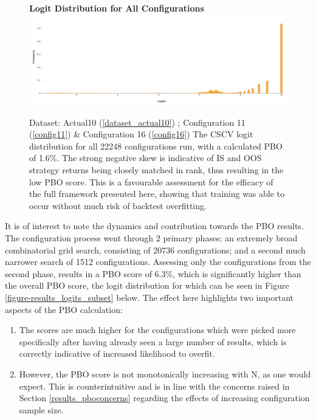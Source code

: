 \documentclass[a4paper,11pt,oneside]{article}
\theoremstyle{plain}
\theoremstyle{definition}
\begin{document}
	\begin{figure}[H]
		\centering 
		\textbf{Logit Distribution for All Configurations}
		\includegraphics[scale=0.25]{images/results/pbo/all_sets_dist.png} 
		\caption[Logit Distribution for All Configurations]{Dataset: Actual10 (\ref{dataset_actual10}) ; Configuration 11 (\ref{config11}) \&  Configuration 16 (\ref{config16})
			\newline The CSCV logit distribution for all 22248 configurations run, with a calculated PBO of 1.6\%. The strong negative skew is indicative of IS and OOS strategy returns being closely matched in rank, thus resulting in the low PBO score. This is a favourable assessment for the efficacy of the full framework presented here, showing that training was able to occur without much risk of backtest overfitting. }
		\label{figure-results_logits_all}
	\end{figure}
	
	
	It is of interest to note the dynamics and contribution towards the PBO results. The configuration process went through 2 primary phases: an extremely broad combinatorial grid search, consisting of 20736 configurations; and a second much narrower search of 1512 configurations. Assessing only the configurations from the second phase, results in a PBO score of 6.3\%, which is significantly higher than the overall PBO score, the logit distribution for which can be seen in Figure \ref{figure-results_logits_subset} below. The effect here highlights two important aspects of the PBO calculation:
	\begin{enumerate}
		\item The scores are much higher for the configurations which were picked more specifically after having already seen a large number of results, which is correctly indicative of increased likelihood to overfit.
		\item However, the PBO score is not monotonically increasing with N, as one would expect. This is counterintuitive and is in line with the concerns raised in Section \ref{results_pboconcerns} regarding the effects of increasing configuration sample size.
	\end{enumerate}
	
\end{document}
